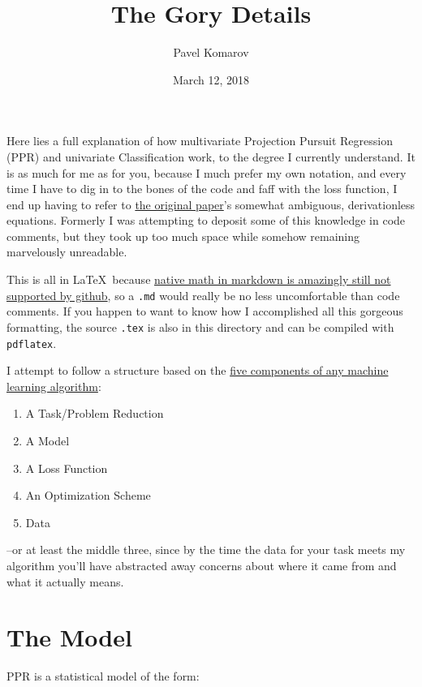 \documentclass[12pt]{article}
\begin{document}
\title{The Gory Details}
\author{Pavel Komarov}
\date{March 12, 2018}
\maketitle

Here lies a full explanation of how multivariate Projection Pursuit Regression (PPR) and univariate Classification work, to the degree I currently understand. It is as much for me as for you, because I much prefer my own notation, and every time I have to dig in to the bones of the code and faff with the loss function, I end up having to refer to \href{http://www.slac.stanford.edu/cgi-wrap/getdoc/slac-pub-3824.pdf}{the original paper}'s somewhat ambiguous, derivationless equations. Formerly I was attempting to deposit some of this knowledge in code comments, but they took up too much space while somehow remaining marvelously unreadable.

This is all in \LaTeX\ because \href{https://github.com/github/markup/issues/897}{native math in markdown is amazingly still not supported by github}, so a \texttt{.md} would really be no less uncomfortable than code comments. If you happen to want to know how I accomplished all this gorgeous formatting, the source \texttt{.tex} is also in this directory and can be compiled with \texttt{pdflatex}.

I attempt to follow a structure based on the \href{http://lmgtfy.com/?q=sorry+this+link+doesn\%27t+work+yet+I+still+have+to+post+those+slides}{five components of any machine learning algorithm}:

\begin{enumerate}
	\setlength\itemsep{-2mm}
	\item A Task/Problem Reduction
	\item A Model
	\item A Loss Function
	\item An Optimization Scheme
	\item Data
\end{enumerate}

--or at least the middle three, since by the time the data for your task meets my algorithm you'll have abstracted away concerns about where it came from and what it actually means.

\section{The Model}

PPR is a statistical model of the form:
\end{document}
